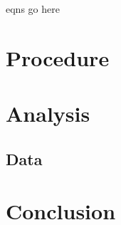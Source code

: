 \documentclass[letterpaper, 12pt]{article}
\begin{document}
\begin{center}
                    eqns go here
\end{center}

\section*{Procedure}

\section*{Analysis}

\subsection*{Data}

\section*{Conclusion}
\end{document}
